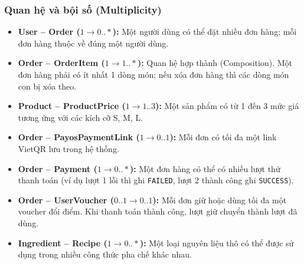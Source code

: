\subsubsection{Quan hệ và bội số (Multiplicity)}
\begin{itemize}[leftmargin=2em]
  \item \textbf{User -- Order ($1 \longrightarrow 0..*$):} Một người dùng có thể đặt nhiều đơn hàng; mỗi đơn hàng thuộc về đúng một người dùng.
  \item \textbf{Order -- OrderItem ($1 \longrightarrow 1..*$):} Quan hệ hợp thành (Composition). Một đơn hàng phải có ít nhất 1 dòng món; nếu xóa đơn hàng thì các dòng món con bị xóa theo.
  \item \textbf{Product -- ProductPrice ($1 \longrightarrow 1..3$):} Một sản phẩm có từ 1 đến 3 mức giá tương ứng với các kích cỡ S, M, L.
  \item \textbf{Order -- PayosPaymentLink ($1 \longrightarrow 0..1$):} Mỗi đơn có tối đa một link VietQR lưu trong hệ thống.
  \item \textbf{Order -- Payment ($1 \longrightarrow 0..*$):} Một đơn hàng có thể có nhiều lượt thử thanh toán (ví dụ lượt 1 lỗi thì ghi \texttt{FAILED}, lượt 2 thành công ghi \texttt{SUCCESS}).
  \item \textbf{Order -- UserVoucher ($0..1 \longrightarrow 0..1$):} Mỗi đơn giữ hoặc dùng tối đa một voucher đổi điểm. Khi thanh toán thành công, lượt giữ chuyển thành lượt đã dùng.
  \item \textbf{Ingredient -- Recipe ($1 \longrightarrow 0..*$):} Một loại nguyên liệu thô có thể được sử dụng trong nhiều công thức pha chế khác nhau.
\end{itemize}
